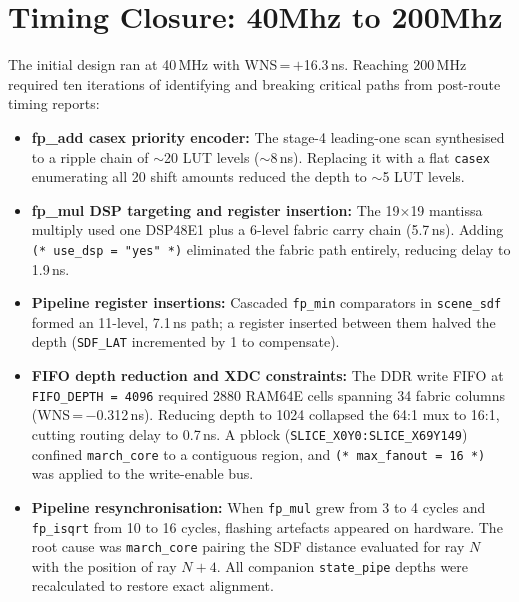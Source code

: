 \FloatBarrier

\section{Timing Closure: 40Mhz to 200Mhz}

  The initial design ran at 40\,MHz with WNS\,=\,$+$16.3\,ns. Reaching                                                      
  200\,MHz required ten iterations of identifying and breaking critical paths
  from post-route timing reports:                                                                                           
                  
  \begin{itemize}
    \item \textbf{fp\_add casex priority encoder:} The stage-4 leading-one
    scan synthesised to a ripple chain of $\sim$20 LUT levels ($\sim$8\,ns).
    Replacing it with a flat \texttt{casex} enumerating all 20 shift amounts
    reduced the depth to $\sim$5 LUT levels.

    \item \textbf{fp\_mul DSP targeting and register insertion:} The
    19$\times$19 mantissa multiply used one DSP48E1 plus a 6-level fabric
    carry chain (5.7\,ns). Adding \texttt{(* use\_dsp = "yes" *)} eliminated
    the fabric path entirely, reducing delay to 1.9\,ns.

    \item \textbf{Pipeline register insertions:} Cascaded \texttt{fp\_min}
    comparators in \texttt{scene\_sdf} formed an 11-level, 7.1\,ns path;
    a register inserted between them halved the depth (\texttt{SDF\_LAT}
    incremented by 1 to compensate).

    \item \textbf{FIFO depth reduction and XDC constraints:} The DDR write
    FIFO at \texttt{FIFO\_DEPTH\,=\,4096} required 2880 RAM64E cells spanning
    34 fabric columns (WNS\,=\,$-$0.312\,ns). Reducing depth to 1024 collapsed
    the 64:1 mux to 16:1, cutting routing delay to 0.7\,ns. A pblock
    (\texttt{SLICE\_X0Y0:SLICE\_X69Y149}) confined \texttt{march\_core} to a
    contiguous region, and \texttt{(* max\_fanout\,=\,16 *)} was applied to
    the write-enable bus.

    \item \textbf{Pipeline resynchronisation:} When \texttt{fp\_mul} grew from
    3 to 4 cycles and \texttt{fp\_isqrt} from 10 to 16 cycles, flashing
    artefacts appeared on hardware. The root cause was \texttt{march\_core}
    pairing the SDF distance evaluated for ray $N$ with the position of ray
    $N+4$. All companion \texttt{state\_pipe} depths were recalculated to
    restore exact alignment.
  \end{itemize}

